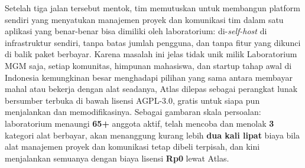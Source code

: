 Setelah tiga jalan tersebut mentok, tim memutuskan untuk membangun platform sendiri yang menyatukan manajemen proyek dan komunikasi tim dalam satu aplikasi yang benar-benar bisa dimiliki oleh laboratorium: di-\textit{self-host} di infrastruktur sendiri, tanpa batas jumlah pengguna, dan tanpa fitur yang dikunci di balik paket berbayar. Karena masalah ini jelas tidak unik milik Laboratorium MGM saja, setiap komunitas, himpunan mahasiswa, dan startup tahap awal di Indonesia kemungkinan besar menghadapi pilihan yang sama antara membayar mahal atau bekerja dengan alat seadanya, Atlas dilepas sebagai perangkat lunak bersumber terbuka di bawah lisensi AGPL-3.0, gratis untuk siapa pun menjalankan dan memodifikasinya. Sebagai gambaran skala persoalan: laboratorium menaungi \textbf{65+} anggota aktif, telah mencoba dan menolak \textbf{3} kategori alat berbayar, akan menanggung kurang lebih \textbf{dua kali lipat} biaya bila alat manajemen proyek dan komunikasi tetap dibeli terpisah, dan kini menjalankan semuanya dengan biaya lisensi \textbf{Rp0} lewat Atlas.
